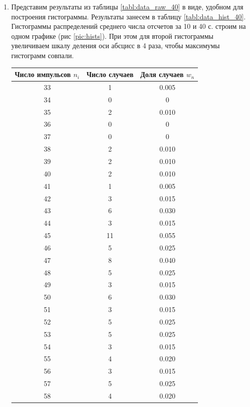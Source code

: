 \documentclass[a4paper, 12pt]{article}
\begin{document}
\begin{enumerate}
    \item Представим результаты из таблицы \ref{tabl:data_raw_40} в виде, удобном для построения гистограммы. Результаты занесем в таблицу \ref{tabl:data_hist_40}. Гистограммы распределений среднего числа отсчетов за 10 и 40 с. строим на одном графике (рис \ref{pic:hists}). При этом для второй гистограммы увеличиваем шкалу деления оси абсцисс в 4 раза, чтобы максимумы гистограмм совпали.
    \begin{table}[h!]
        \centering
        \begin{tabular}{| c | c | c |}
        \hline
        \textbf{Число импульсов $n_i$} & \textbf{Число случаев} & \textbf{Доля случаев $w_n$} \\\hline\hline
        33 & 1  & 0.005 \\\hline
        34 & 0  & 0     \\\hline
        35 & 2  & 0.010  \\\hline
        36 & 0  & 0     \\\hline
        37 & 0  & 0     \\\hline
        38 & 2  & 0.010  \\\hline
        39 & 2  & 0.010  \\\hline
        40 & 2  & 0.010  \\\hline
        41 & 1  & 0.005 \\\hline
        42 & 3  & 0.015 \\\hline
        43 & 6  & 0.030  \\\hline
        44 & 3  & 0.015 \\\hline
        45 & 11 & 0.055 \\\hline
        46 & 5  & 0.025 \\\hline
        47 & 8  & 0.040  \\\hline
        48 & 5  & 0.025 \\\hline
        49 & 3  & 0.015 \\\hline
        50 & 6  & 0.030  \\\hline
        51 & 3  & 0.015 \\\hline
        52 & 5  & 0.025 \\\hline
        53 & 5  & 0.025 \\\hline
        54 & 3  & 0.015 \\\hline
        55 & 4  & 0.020  \\\hline
        56 & 3  & 0.015 \\\hline
        57 & 5  & 0.025 \\\hline
        58 & 4  & 0.020  \\\hline

\end{tabular}
\end{table}
\end{enumerate}
\end{document}
